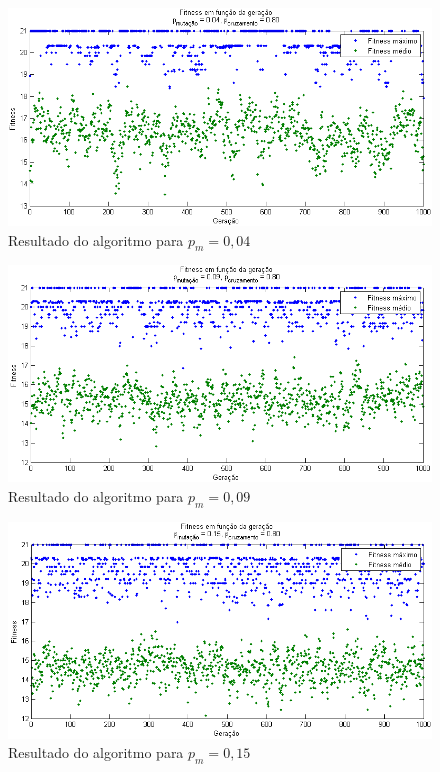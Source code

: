 \documentclass[12pt]{elsarticle}
\begin{document}
	\newpage
	\begin{figure}[h]
		\centering
		\includegraphics[width=13cm]{img/pm_004.png}
		\caption{Resultado do algoritmo para $p_{m}=0,04$}
		\label{fig:pm_004}
	\end{figure}
	
	\begin{figure}[h]
		\centering
		\includegraphics[width=13cm]{img/pm_009.png}
		\caption{Resultado do algoritmo para $p_{m}=0,09$}
		\label{fig:pm_009}
	\end{figure}
	\newpage
	\begin{figure}[h]
		\centering
		\includegraphics[width=13cm]{img/pm_015.png}
		\caption{Resultado do algoritmo para $p_{m}=0,15$}
		\label{fig:pm_015}
	\end{figure}
	
\end{document}
